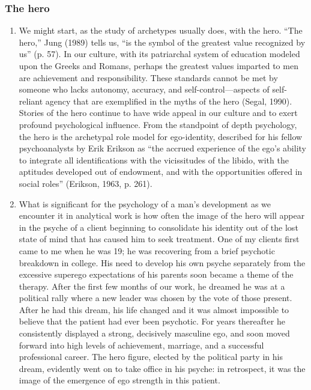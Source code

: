 \subsubsection{The hero}

\begin{enumerate}

    \item {} We might start, as the study of archetypes
        usually does, with the hero. ``The hero,'' Jung (1989) tells us, ``is the
        symbol of the greatest value recognized by us'' (p. 57). In our culture,
        with its patriarchal system of education modeled upon the Greeks and
        Romans, perhaps the greatest values imparted to men are achievement and
        responsibility. These standards cannot be met by someone who lacks
        autonomy, accuracy, and self-control—aspects of self-reliant agency
        that are exemplified in the myths of the hero (Segal, 1990). Stories of
        the hero continue to have wide appeal in our culture and to exert
        profound psychological influence. From the standpoint of depth
        psychology, the hero is the archetypal role model for ego-identity,
        described for his fellow psychoanalysts by Erik Erikson as ``the accrued
        experience of the ego's ability to integrate all identifications with
        the vicissitudes of the libido, with the aptitudes developed out of
        endowment, and with the opportunities offered in social roles''
        (Erikson, 1963, p. 261).

    \item {} What is significant for the
        psychology of a man's development as we encounter it in analytical work
        is how often the image of the hero will appear in the psyche of a
        client beginning to consolidate his identity out of the lost state of
        mind that has caused him to seek treatment. One of my clients first
        came to me when he was 19; he was recovering from a brief psychotic
        breakdown in college. His need to develop his own psyche separately
        from the excessive superego expectations of his parents soon became a
        theme of the therapy. After the first few months of our work, he
        dreamed he was at a political rally where a new leader was chosen by
        the vote of those present. After he had this dream, his life changed
        and it was almost impossible to believe that the patient had ever been
        psychotic. For years thereafter he consistently displayed a strong,
        decisively masculine ego, and soon moved forward into high levels of
        achievement, marriage, and a successful professional career. The hero
        figure, elected by the political party in his dream, evidently went on
        to take office in his psyche: in retrospect, it was the image of the
        emergence of ego strength in this patient.


\end{enumerate}
